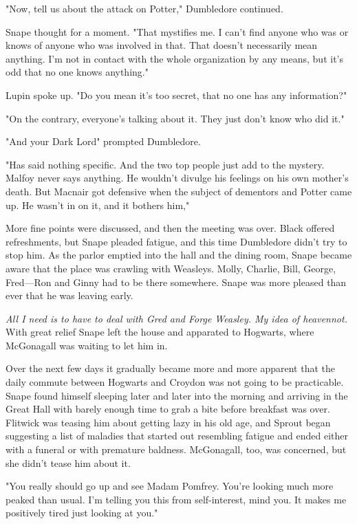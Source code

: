 "Now, tell us about the attack on Potter," Dumbledore continued.

Snape thought for a moment. "That mystifies me. I can't find anyone who was or knows of anyone who was involved in that. That doesn't necessarily mean anything. I'm not in contact with the whole organization by any means, but it's odd that no one knows anything."

Lupin spoke up. "Do you mean it's too secret, that no one has any information?"

"On the contrary, everyone's talking about it. They just don't know who did it."

"And your Dark Lord{\el}" prompted Dumbledore.

"Has said nothing specific. And the two top people just add to the mystery. Malfoy never says anything. He wouldn't divulge his feelings on his own mother's death. But Macnair got defensive when the subject of dementors and Potter came up. He wasn't in on it, and it bothers him,"

More fine points were discussed, and then the meeting was over. Black offered refreshments, but Snape pleaded fatigue, and this time Dumbledore didn't try to stop him. As the parlor emptied into the hall and the dining room, Snape became aware that the place was crawling with Weasleys. Molly, Charlie, Bill, George, Fred—Ron and Ginny had to be there somewhere. Snape was more pleased than ever that he was leaving early.

\emph{All I need is to have to deal with Gred and Forge Weasley. My idea of heaven{\el}not.} With great relief Snape left the house and apparated to Hogwarts, where McGonagall was waiting to let him in.

Over the next few days it gradually became more and more apparent that the daily commute between Hogwarts and Croydon was not going to be practicable. Snape found himself sleeping later and later into the morning and arriving in the Great Hall with barely enough time to grab a bite before breakfast was over. Flitwick was teasing him about getting lazy in his old age, and Sprout began suggesting a list of maladies that started out resembling fatigue and ended either with a funeral or with premature baldness. McGonagall, too, was concerned, but she didn't tease him about it.

"You really should go up and see Madam Pomfrey. You're looking much more peaked than usual. I'm telling you this from self-interest, mind you. It makes me positively tired just looking at you."

